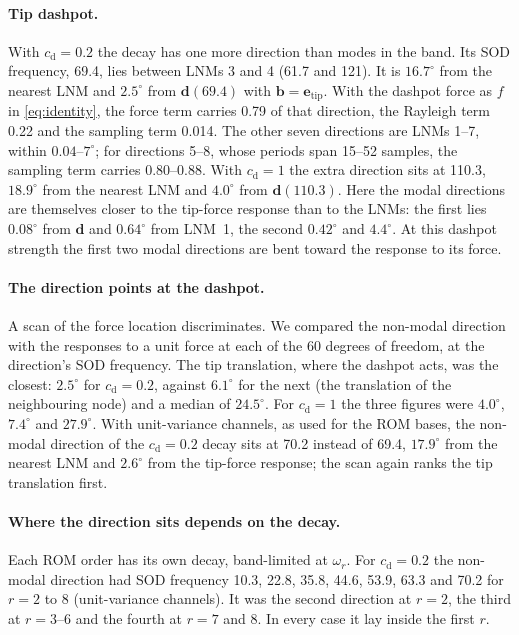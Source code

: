 \documentclass[preprint,12pt]{elsarticle}
\begin{document}
\paragraph{Tip dashpot.} With $c_{\mathrm d}=0.2$ the decay has one more direction than modes in the band. Its SOD frequency, 69.4, lies between LNMs 3 and 4 (61.7 and 121). It is $16.7^\circ$ from the nearest LNM and $2.5^\circ$ from $\bm{d}(69.4)$ with $\bm{b}=\bm{e}_{\mathrm{tip}}$. With the dashpot force as $f$ in \eqref{eq:identity}, the force term carries 0.79 of that direction, the Rayleigh term 0.22 and the sampling term 0.014. The other seven directions are LNMs 1--7, within $0.04$--$7^\circ$; for directions 5--8, whose periods span 15--52 samples, the sampling term carries 0.80--0.88.
With $c_{\mathrm d}=1$ the extra direction sits at 110.3, $18.9^\circ$ from the nearest LNM and $4.0^\circ$ from $\bm{d}(110.3)$. Here the modal directions are themselves closer to the tip-force response than to the LNMs: the first lies $0.08^\circ$ from $\bm{d}$ and $0.64^\circ$ from LNM~1, the second $0.42^\circ$ and $4.4^\circ$. At this dashpot strength the first two modal directions are bent toward the response to its force.

\paragraph{The direction points at the dashpot.} A scan of the force location discriminates. We compared the non-modal direction with the responses to a unit force at each of the 60 degrees of freedom, at the direction's SOD frequency. The tip translation, where the dashpot acts, was the closest: $2.5^\circ$ for $c_{\mathrm d}=0.2$, against $6.1^\circ$ for the next (the translation of the neighbouring node) and a median of $24.5^\circ$. For $c_{\mathrm d}=1$ the three figures were $4.0^\circ$, $7.4^\circ$ and $27.9^\circ$.
With unit-variance channels, as used for the ROM bases, the non-modal direction of the $c_{\mathrm d}=0.2$ decay sits at 70.2 instead of 69.4, $17.9^\circ$ from the nearest LNM and $2.6^\circ$ from the tip-force response; the scan again ranks the tip translation first.

\paragraph{Where the direction sits depends on the decay.} Each ROM order has its own decay, band-limited at $\omega_r$. For $c_{\mathrm d}=0.2$ the non-modal direction had SOD frequency 10.3, 22.8, 35.8, 44.6, 53.9, 63.3 and 70.2 for $r=2$ to 8 (unit-variance channels). It was the second direction at $r=2$, the third at $r=3$--6 and the fourth at $r=7$ and 8. In every case it lay inside the first $r$.
\end{document}
